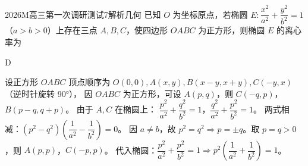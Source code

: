 
\begin{problem}{2026}{M}{高三第一次调研测试}{7}{解析几何}
已知 $O$ 为坐标原点，若椭圆 $E:\dfrac{x^2}{a^2}+\dfrac{y^2}{b^2}=1$（$a>b>0$）上存在三点 $A,B,C$，使四边形 $OABC$ 为正方形，则椭圆 $E$ 的离心率为
\begin{choices}
\end{choices}
\end{problem}

\begin{answer}
D
\end{answer}

\begin{solutions}
设正方形 $OABC$ 顶点顺序为 $O(0,0), A(x,y), B(x-y,x+y), C(-y,x)$（逆时针旋转 90°），  
因 $OABC$ 为正方形，可设 $A(p,q)$，则 $C(-q,p)$，$B(p-q,q+p)$。  
由于 $A,C$ 在椭圆上：  
$\dfrac{p^2}{a^2}+\dfrac{q^2}{b^2}=1$，$\dfrac{q^2}{a^2}+\dfrac{p^2}{b^2}=1$。  
两式相减：$(p^2-q^2)\left(\dfrac{1}{a^2}-\dfrac{1}{b^2}\right)=0$。  
因 $a\neq b$，故 $p^2=q^2\Rightarrow p=\pm q$。取 $p=q>0$，则 $A(p,p)$，$C(-p,p)$。  
代入椭圆：$\dfrac{p^2}{a^2}+\dfrac{p^2}{b^2}=1\Rightarrow p^2\left(\dfrac{1}{a^2}+\dfrac{1}{b^2}\right)=1$。  

\end{solutions}